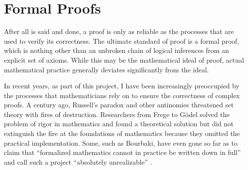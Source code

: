 \section*{Formal Proofs}

After all is said and done, a proof is only as reliable as the
processes that are used to verify its correctness.  The ultimate
standard of proof is a formal proof, which is nothing other
than an unbroken chain of logical inferences from an explicit set of
axioms.  While this may be the mathematical ideal of proof, actual
mathematical practice generally deviates significantly from the ideal.



%
%
%
%

In recent years, as part of this project, I have been increasingly preoccupied by the
processes that mathematicians rely on to ensure the correctness of complex
proofs. A century ago, Russell's paradox and other antinomies threatened
 set theory  with fires of destruction.
Researchers from Frege to G\"odel solved the problem of
rigor in mathematics and found a theoretical solution but did not
extinguish the fire at the foundations of mathematics
because they omitted the practical implementation. Some, such as
Bourbaki, have even gone so far as to claim that ``formalized
mathematics cannot in practice be written down in full'' and call
such a project
``absolutely unrealizable'' \cite[pp.~10--11]{Bour:68:Sets}. %

